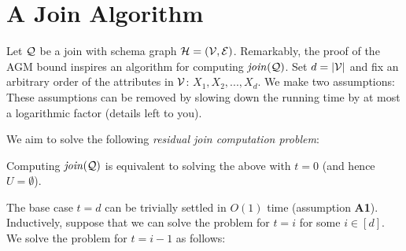 \section{A Join Algorithm} \label{sec:alg}

Let $\mathcal{Q}$ be a join with schema graph $\mathcal{H} = (\mathcal{V}, \mathcal{E})$. Remarkably, the proof of the AGM bound inspires an algorithm for computing $\mathit{join}(\mathcal{Q})$. Set $d = |\mathcal{V}|$ and fix an arbitrary order of the attributes in $\mathcal{V}$: $X_1, X_2, ..., X_d$. We make two assumptions:
These assumptions can be removed by slowing down the running time by at most a logarithmic factor (details left to you).

\vgap

We aim to solve the following {\em residual join computation problem}:

\vslit


\vslit

\noindent Computing $\mathit{join}(\mathcal{Q})$ is equivalent to solving the above with $t = 0$ (and hence $U = \emptyset$).

 The base case $t = d$ can be trivially settled in $O(1)$ time (assumption {\bf A1}). Inductively, suppose that we can solve the problem for $t = i$ for some $i \in [d]$. We solve the problem for $t = i-1$ as follows:

